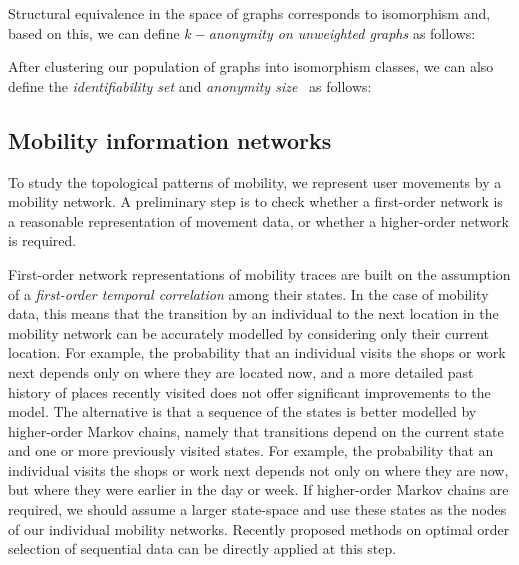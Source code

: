 Structural equivalence in the space of graphs corresponds to isomorphism and, based on this, we can define \emph{$k-$anonymity on unweighted graphs} as follows:



\vspace{.4cm}
After clustering our population of graphs into isomorphism classes, we can also define the \emph{identifiability set} and \emph{anonymity size}~\cite{anon_terminology} as follows:



\subsection{Mobility information networks\label{sec:mobility-networks}}

To study the topological patterns of mobility, we represent user movements by a mobility network.
A preliminary step is to check whether a first-order network is a reasonable representation of movement data, or whether a higher-order network is required.

First-order network representations of mobility traces are built on the assumption of a \emph{first-order temporal correlation} among their states.
In the case of mobility data, this means that the transition by an individual to the next location in the mobility network can be accurately modelled by considering only their current location.
For example, the probability that an individual visits the shops or work next depends only on where they are located now, and a more detailed past history of places recently visited does not offer significant improvements to the model.
The alternative is that a sequence of the states is better modelled by higher-order Markov chains, namely that transitions depend on the current state and one or more previously visited states.
For example, the probability that an individual visits the shops or work next depends not only on where they are now, but where they were earlier in the day or week.
If higher-order Markov chains are required, we should assume a larger state-space and use these states as the nodes of our individual mobility networks.
Recently proposed methods on optimal order selection of sequential data \cite{xu2016representing, scholtes2017network} can be directly applied at this step.

